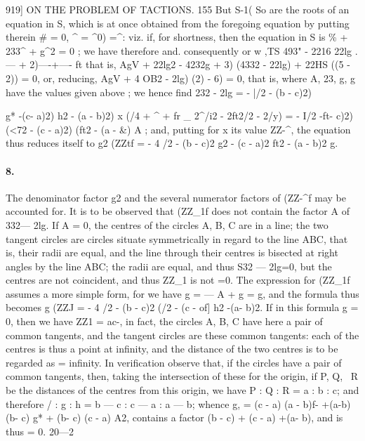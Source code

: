 \documentclass[11pt,a4paper]{book}
\begin{document}
919]  ON    THE   PROBLEM    OF   TACTIONS.  155
But   S-1(    So   are   the   roots   of  an   equation   in   S,   which   is   at   once    obtained    from
the  foregoing  equation  by  putting  therein  \#  =  0,  ^  =  ^0)  =^:    viz.  if,  for  shortness,
then  the  equation  in  S  is
\%  +  233^  +  g^2  =  0  ;
we  have  therefore
and.  consequently
or     w     ,TS  493"  -  2216     22lg     .
---     +  2)----+----  ft
that  is,
AgV  +  22lg2  -  4232g  +  3)  (4332  -  22lg)  +  22HS  ((5  -  2))  =  0,
or,  reducing,
AgV  +  4  OB2  -  2lg)  (2)  -  6)  =  0,
that  is,
where  A,  23,  g,  g  have  the  values  given  above  ;   we  hence  find
232  -  2lg  =  -  |/2  -  (b  -  c)2)  {g*  -(c-  a)2)  {h2  -  (a  -  b)2)  x  (/4  +  ^  +  fr  \_  2^/i2  -  2ft2/2  -  2/y)
=  -  I/2  -ft-  c)2)  (<72  -  (c  -  a)2)  (ft2  -  (a  -  \&) }  A  ;
and,  putting  for  x  its  value  ZZ-^,  the  equation  thus  reduces  itself  to
g2  (ZZtf  =  -  4  {/2  -  (b  -  c)2}  {g2  -  (c  -  a)2}  {ft2  -  (a  -  b)2}  g.
\paragraph{8.} The  denominator  factor  g2  and  the  several  numerator  factors  of  (ZZ-^f  may
be  accounted  for.  It  is  to  be  observed  that  (ZZ_1f  does  not  contain  the  factor  A  of
332---  2lg.  If  A  =  0,  the  centres  of  the  circles  A,  B,  C  are  in  a  line;  the  two  tangent
circles  are  circles  situate  symmetrically  in  regard  to  the  line  ABC,  that  is,  their
radii  are  equal,  and  the  line  through  their  centres  is  bisected  at  right  angles  by
the  line  ABC;  the  radii  are  equal,  and  thus  S32  ---  2lg=0,  but  the  centres  are  not
coincident,  and  thus  ZZ_1  is  not  =0.  The  expression  for  (ZZ_1f  assumes  a  more  simple
form,  for  we  have  g  =  ---  A  +  g  =  g,  and  the  formula  thus  becomes
g  (ZZJ  =  -  4  {/2  -  (b  -  c)2}  {(/2  -  (c  -  of]  {h2  -(a-  b)2}.}
If  in  this  formula  g  =  0,  then  we  have  ZZ1  =  ac-,  in  fact,  the  circles  A,  B,  C
have  here  a  pair  of  common  tangents,  and  the  tangent  circles  are  these  common
tangents:  each  of  the  centres  is  thus  a  point  at  infinity,  and  the  distance  of  the
two  centres  is  to  be  regarded  as  =  infinity.  In  verification  observe  that,  if  the  circles
have  a  pair  of  common  tangents,  then,  taking  the  intersection  of  these  for  the  origin,
if  P,  Q,  ~R  be  the  distances  of  the  centres  from  this  origin,  we  have
P  :  Q  :  R  =  a  :  b  :  c;
and  therefore
/  :  g  :  h  =  b  ---  c  :  c  ---  a  :  a  ---  b;
whence
g,  =  (c  -  a)  (a  -  b)f-  +(a-b)(b-  c)  g*  +  (b-  c)  (c  -  a)  A2,
contains  a  factor  (b  -  c)  +  (c  -  a)  +(a-  b),  and  is  thus  =  0.
20---2


}
\end{document}
